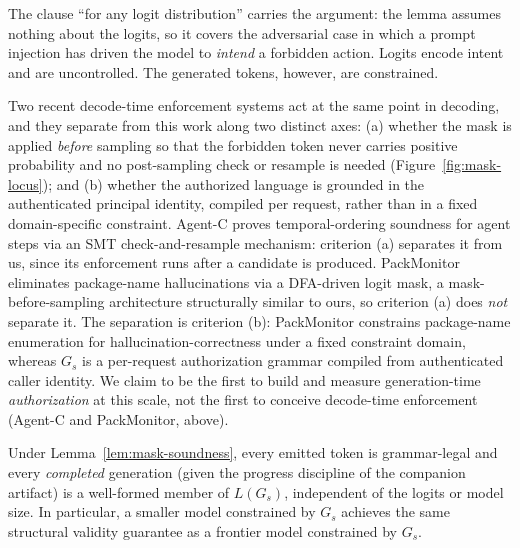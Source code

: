 The clause ``for any logit distribution'' carries the argument: the lemma assumes nothing about the logits, so it covers the adversarial case in which a prompt injection has driven the model to \emph{intend} a forbidden action. Logits encode intent and are uncontrolled. The generated tokens, however, are constrained.

\begin{remark}
\label{rem:nearest-neighbor}
Two recent decode-time enforcement systems act at the same point in decoding, and they separate from this work along two distinct axes: (a) whether the mask is applied \emph{before} sampling so that the forbidden token never carries positive probability and no post-sampling check or resample is needed (Figure~\ref{fig:mask-locus}); and (b) whether the authorized language is grounded in the authenticated principal identity, compiled per request, rather than in a fixed domain-specific constraint. Agent-C \cite{agentc2025} proves temporal-ordering soundness for agent steps via an SMT check-and-resample mechanism: criterion (a) separates it from us, since its enforcement runs after a candidate is produced. PackMonitor \cite{packmonitor2026} eliminates package-name hallucinations via a DFA-driven logit mask, a mask-before-sampling architecture structurally similar to ours, so criterion (a) does \emph{not} separate it. The separation is criterion (b): PackMonitor constrains package-name enumeration for hallucination-correctness under a fixed constraint domain, whereas \(G_s\) is a per-request authorization grammar compiled from authenticated caller identity. We claim to be the first to build and measure generation-time \emph{authorization} at this scale, not the first to conceive decode-time enforcement (Agent-C and PackMonitor, above).
\end{remark}

\begin{corollary}
\label{cor:validity}
Under Lemma~\ref{lem:mask-soundness}, every emitted token is grammar-legal and every \emph{completed} generation (given the progress discipline of the companion artifact) is a well-formed member of \(L(G_s)\), independent of the logits or model size. In particular, a smaller model constrained by \(G_s\) achieves the same structural validity guarantee as a frontier model constrained by \(G_s\).
\end{corollary}

